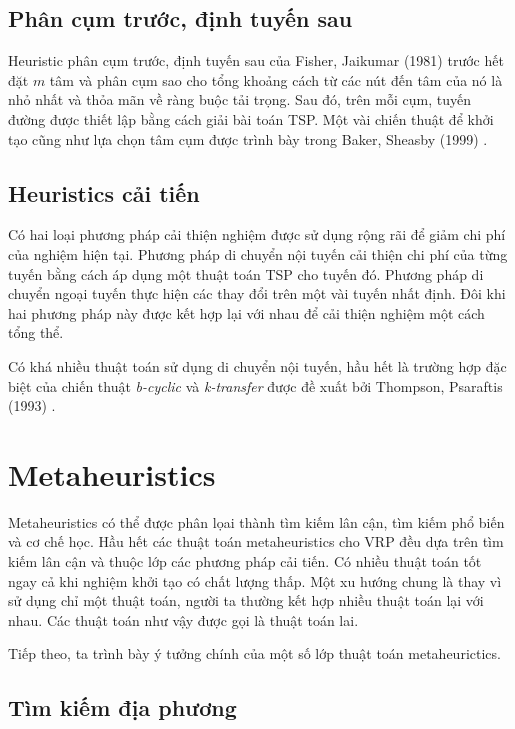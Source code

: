 \subsection{Phân cụm trước, định tuyến sau}

Heuristic phân cụm trước, định tuyến sau của Fisher, Jaikumar (1981) \cite{fisher1981generalized} trước hết đặt $m$ tâm và phân cụm sao cho tổng khoảng cách từ các nút đến tâm của nó là nhỏ nhất và thỏa mãn về ràng buộc tải trọng. Sau đó, trên mỗi cụm, tuyến đường được thiết lập bằng cách giải bài toán TSP. Một vài chiến thuật để khởi tạo cũng như lựa chọn tâm cụm được trình bày trong Baker, Sheasby (1999) \cite{baker1999extensions}.

\subsection{Heuristics cải tiến}

Có hai loại phương pháp cải thiện nghiệm được sử dụng rộng rãi để giảm chi phí của nghiệm hiện tại. Phương pháp di chuyển nội tuyến cải thiện chi phí của từng tuyến bằng cách áp dụng một thuật toán TSP cho tuyến đó. Phương pháp di chuyển ngoại tuyến thực hiện các thay đổi trên một vài tuyến nhất định. Đôi khi hai phương pháp này được kết hợp lại với nhau để cải thiện nghiệm một cách tổng thể.

Có khá nhiều thuật toán sử dụng di chuyển nội tuyến, hầu hết là trường hợp đặc biệt của chiến thuật \textit{b-cyclic} và \textit{k-transfer} được đề xuất bởi Thompson, Psaraftis (1993) \cite{thompson1993cyclic}. 

\section{Metaheuristics}

Metaheuristics có thể được phân lọai thành tìm kiếm lân cận, tìm kiếm phổ biến và cơ chế học. Hầu hết các thuật toán metaheuristics cho VRP đều dựa trên tìm kiếm lân cận và thuộc lớp các phương pháp cải tiến. Có nhiều thuật toán tốt ngay cả khi nghiệm khởi tạo có chất lượng thấp. Một xu hướng chung là thay vì sử dụng chỉ một thuật toán, người ta thường kết hợp nhiều thuật toán lại với nhau. Các thuật toán như vậy được gọi là thuật toán lai.

Tiếp theo, ta trình bày ý tưởng chính của một số lớp thuật toán metaheurictics.

\subsection{Tìm kiếm địa phương}


